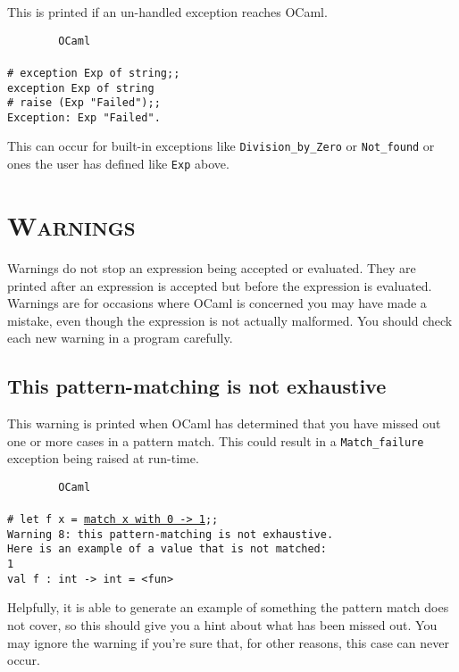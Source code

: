 \documentclass[]{book}
\newcommand{\smspace}{\vspace{4mm}}
\begin{document}
This is printed if an un-handled exception reaches OCaml.

\smspace
\noindent\verb!        OCaml!\\
\noindent\\
\texttt{\# exception Exp of string;;}\\
\texttt{exception Exp of string}\\
\texttt{\# raise (Exp "Failed");;}\\
\texttt{Exception:\ Exp "Failed".}
\smspace

\noindent This can occur for built-in exceptions like \texttt{Division\_by\_Zero} or \texttt{Not\_found} or ones the user has defined like \texttt{Exp} above.

\section*{\scshape Warnings}

Warnings do not stop an expression being accepted or evaluated. They are printed after an expression is accepted but before the expression is evaluated. Warnings are for occasions where OCaml is concerned you may have made a mistake, even though the expression is not actually malformed. You should check each new warning in a program carefully.

\subsection*{This pattern-matching is not exhaustive}

This warning is printed when OCaml has determined that you have missed out one or more cases in a pattern match. This could result in a \texttt{Match\_failure} exception being raised at run-time.

\smspace
\noindent\verb!        OCaml!\\
\noindent\\
\texttt{\# let f x = \underline{match x with 0 -> 1};;}\\
\texttt{Warning 8:\ this pattern-matching is not exhaustive.}\\
\texttt{Here is an example of a value that is not matched:}\\
\texttt{1}\\
\texttt{val f :\ int -> int = <fun>}
\smspace

\noindent Helpfully, it is able to generate an example of something the pattern match does not cover, so this should give you a hint about what has been missed out. You may ignore the warning if you're sure that, for other reasons, this case can never occur.
\end{document}
